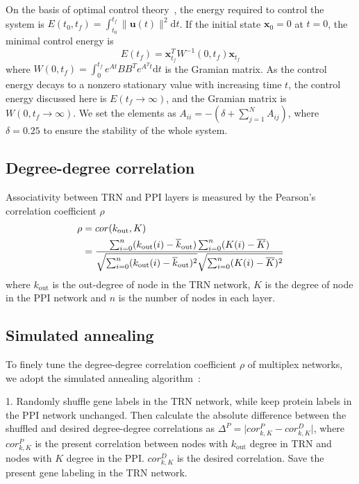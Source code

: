 \documentclass[%
 reprint,
 amsmath,amssymb,
 aps,
]{revtex4-2}
\begin{document}
On the basis of optimal control theory~\cite{rugh1996linear}, the energy required to control the system is $E(t_0,t_f)=\int_{t_0}^{t_f}\|\mathbf{u}(t)\|^2\mathrm{d}t$. If the initial state $\mathbf{x}_0=0$ at $t=0$, the minimal control energy is 
\begin{equation} 
\label{eq5}
E(t_f)=\mathbf{x}_{t_f}^TW^{-1}(0,t_f)\mathbf{x}_{t_f}
\end{equation}
where $W(0,t_f)=\int_{0}^{t_f}e^{At}BB^Te^{A^Tt}\mathrm{d}t$ is the Gramian matrix. As the control energy decays to a nonzero stationary value with increasing time $t$, the control energy discussed here is $E (t_f\rightarrow\infty)$, and the Gramian matrix is $W (0,t_f\rightarrow\infty)$. We set the elements as $A_{ii}=-(\delta + \sum_{j=1}^{N}A_{ij})$, where $\delta=0.25$ to ensure the stability of the whole system.
 
\subsection{Degree-degree correlation}
Associativity between TRN and PPI layers is measured by the Pearson’s correlation coefficient $\rho$~\cite{foster2010edge}
\begin{equation} 
\label{eq6}
\begin{aligned}
\rho &=cor(k_\text{out},K)\\
     &={{\sum_{i=0}^{n} (k_{\text{out}}(i)-\overline{k}_\text{out})\sum_{i=0}^n(K(i)-\overline{K})}\over{\sqrt{\sum_{i=0}^n(k_{\text{out}}(i)-\overline{k}_\text{out})^2}\sqrt{\sum_{i=0}^n(K(i)-\overline{K})^2}}}
     \end{aligned}
\end{equation}
where $k_\text{out}$ is the out-degree of node in the TRN network, $K$ is the degree of node in the PPI network and $n$ is the number of nodes in each layer.

\subsection{Simulated annealing}
To finely tune the degree-degree correlation coefficient $\rho$ of multiplex networks, we adopt the simulated annealing algorithm~\cite{kirkpatrick1983optimization}:

1. Randomly shuffle gene labels in the TRN network, while keep protein labels in the PPI network unchanged. Then calculate the absolute difference between the shuffled and desired degree-degree correlations as $\Delta^{P}=\vert cor_{k,K}^{P}-cor_{k,K}^{D} \vert$, where $cor_{k,K}^{P}$ is the present correlation between nodes with $k_\text{out}$ degree in TRN and nodes with $K$ degree in the PPI. $cor_{k,K}^{D}$ is the desired correlation. Save the present gene labeling in the TRN network.
\end{document}
